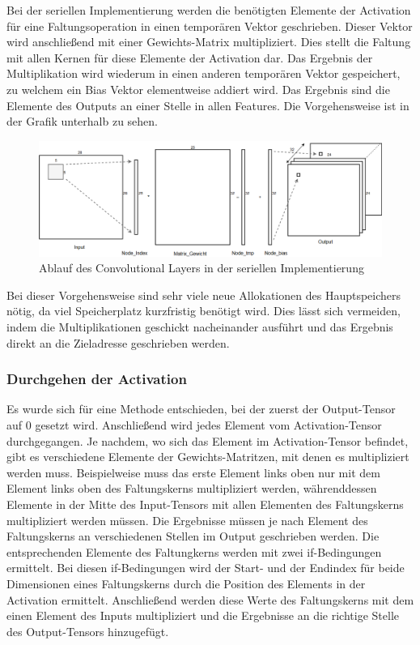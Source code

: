 \documentclass[../main.tex]{subfiles}
\begin{document}
Bei der seriellen Implementierung werden die benötigten Elemente der Activation für eine Faltungsoperation in einen temporären Vektor geschrieben. Dieser Vektor wird anschließend mit einer Gewichts-Matrix multipliziert. Dies stellt die Faltung mit allen Kernen für diese Elemente der Activation dar. Das Ergebnis der Multiplikation wird wiederum in einen anderen temporären Vektor gespeichert, zu welchem ein Bias Vektor elementweise addiert wird. Das Ergebnis sind die Elemente des Outputs an einer Stelle in allen Features. Die Vorgehensweise ist in der Grafik unterhalb zu sehen.

\begin{figure}[!htbp]
	\centering
	\includegraphics[width=\textwidth]{../images/Benz/Conv_Layer_Seriel.png} %
	\caption{Ablauf des Convolutional Layers in der seriellen Implementierung} 
	\label{fig:conv_layer_seriell}
\end{figure}


Bei dieser Vorgehensweise sind sehr viele neue Allokationen des Hauptspeichers nötig, da viel Speicherplatz kurzfristig benötigt wird. Dies lässt sich vermeiden, indem die Multiplikationen geschickt nacheinander ausführt und das Ergebnis direkt an die Zieladresse geschrieben werden. 

\subsubsection{Durchgehen der Activation}

Es wurde sich für eine Methode entschieden, bei der zuerst der Output-Tensor auf 0 gesetzt wird. Anschließend wird jedes Element vom Activation-Tensor durchgegangen. Je nachdem, wo sich das Element im Activation-Tensor befindet, gibt es verschiedene Elemente der Gewichts-Matritzen, mit denen es multipliziert werden muss. Beispielweise muss das erste Element links oben nur mit dem Element links oben des Faltungskerns multipliziert werden, währenddessen Elemente in der Mitte des Input-Tensors mit allen Elementen des Faltungskerns multipliziert werden müssen. Die Ergebnisse müssen je nach Element des Faltungskerns an verschiedenen Stellen im Output geschrieben werden.
Die entsprechenden Elemente des Faltungkerns werden mit zwei if-Bedingungen ermittelt. Bei diesen if-Bedingungen wird der Start- und der Endindex für beide Dimensionen eines Faltungskerns durch die Position des Elements in der Activation ermittelt. Anschließend werden diese Werte des Faltungskerns mit dem einen Element des Inputs multipliziert und die Ergebnisse an die richtige Stelle des Output-Tensors hinzugefügt.
\end{document}
